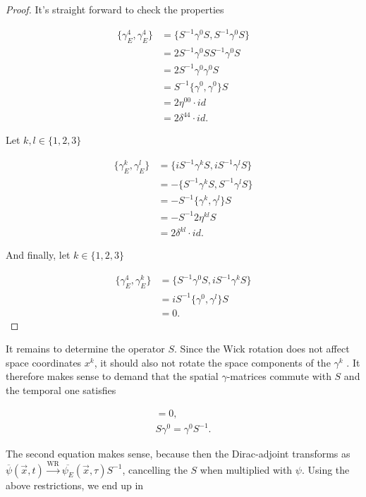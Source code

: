 \documentclass{article}
\theoremstyle{plain} %
\theoremstyle{convention} %
\theoremstyle{remark} %
\numberwithin{equation}{section}
\begin{document}
\begin{proof}

It's straight forward to check the properties

\begin{align*}
    \{\gamma_E^4, \gamma_E^4\} &= \{ S^{-1} \gamma^0 S, S^{-1} \gamma^0 S \} \\
    &= 2 S^{-1} \gamma^0 S S^{-1} \gamma^0 S \\
    &= 2 S^{-1} \gamma^0 \gamma^0 S \\
    &= S^{-1} \{\gamma^0, \gamma^0\} S \\
    &= 2 \eta^{00} \cdot id \\
    &= 2 \delta^{44} \cdot id.
\end{align*}

Let $k,l \in \{1, 2, 3\}$

\begin{align*}
    \{\gamma_E^k, \gamma_E^l\} &= \{ i S^{-1} \gamma^k S, i S^{-1} \gamma^l S \} \\
    &= - \{ S^{-1} \gamma^k S, S^{-1} \gamma^l S \} \\
    &= - S^{-1} \{\gamma^k, \gamma^l \} S \\
    &= - S^{-1} 2 \eta^{kl} S \\
    &= 2 \delta^{kl} \cdot id.
\end{align*}

And finally, let $k \in \{1, 2, 3\}$

\begin{align*}
    \{\gamma_E^4, \gamma_E^k\} &= \{ S^{-1} \gamma^0 S, i S^{-1} \gamma^k S \} \\
    &= i S^{-1} \{\gamma^0, \gamma^l \} S  \\
    &= 0.
\end{align*}

\end{proof}

It remains to determine the operator $S$. Since the Wick rotation does not affect space coordinates $x^k$, it should also not rotate the space components of the $\gamma^k$ \cite{van1996}. It therefore makes sense to demand that the spatial $\gamma$-matrices commute with $S$ and the temporal one satisfies

\begin{align*}
    [S, \gamma^k] = 0, \\
    S \gamma^0 = \gamma^0 S^{-1}.
\end{align*}

The second equation makes sense, because then the Dirac-adjoint transforms as $\overline{\psi}(\vec{x}, t) \stackrel{\text{WR}}{\longrightarrow} \overline{\psi_E}(\vec{x}, \tau) S^{-1}$, cancelling the $S$ when multiplied with $\psi$. Using the above restrictions, we end up in
\end{document}
